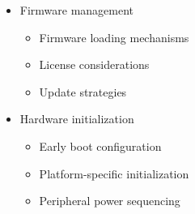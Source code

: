 \documentclass[
]{article}
\providecommand{\tightlist}{%
  \setlength{\itemsep}{0pt}\setlength{\parskip}{0pt}}
\begin{document}
\begin{itemize}
\begin{itemize}
\begin{itemize}
      \begin{itemize}
      \tightlist
      \item
        Module recipe templates
      \item
        Kernel version dependencies
      \item
        Module signing and security
      \end{itemize}
    \item
      Firmware management

      \begin{itemize}
      \tightlist
      \item
        Firmware loading mechanisms
      \item
        License considerations
      \item
        Update strategies
      \end{itemize}
    \item
      Hardware initialization

      \begin{itemize}
      \tightlist
      \item
        Early boot configuration
      \item
        Platform-specific initialization
      \item
        Peripheral power sequencing
      \end{itemize}
    \end{itemize}
  \end{itemize}
\end{itemize}
\end{document}
